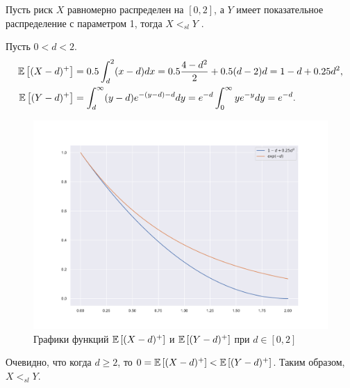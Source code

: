 \problem{}
Пусть риск $X$ равномерно распределен на $[0, 2]$, а $Y$ имеет показательное распределение с параметром 1, тогда $X <_{sl} Y$ .

\solution{}
    Пусть $0 < d < 2$. 
    \begin{align}
        \mathbb{E}\left[(X - d)^+\right] &= 0.5 \int_{d}^{2} (x-d) dx = 0.5 \frac{4 - d^2}{2} + 0.5(d-2)d = 1 - d + 0.25d^2, \\
        \mathbb{E}\left[(Y - d)^+\right] &= \int_{d}^{\infty} (y-d) e^{-(y-d) - d} dy = e^{-d} \int_{0}^{\infty} y e^{-y} dy = e^{-d}.
    \end{align}
    \begin{figure}[htbp]
        \includegraphics[width=\textwidth]{pics/hw6t4p1.pdf}
        \caption{Графики функций $\mathbb{E}\left[(X - d)^+\right]$ и $\mathbb{E}\left[(Y - d)^+\right]$ при $d\in[0, 2]$}
    \end{figure}
    Очевидно, что когда $d \geq 2$, то $0 = \mathbb{E}\left[(X - d)^+\right] < \mathbb{E}\left[(Y - d)^+\right]$. Таким образом, $X <_{sl} Y$.